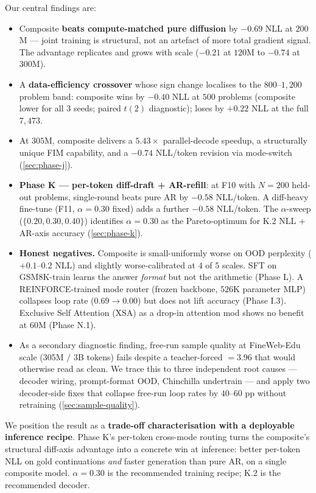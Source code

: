 Our central findings are:

\begin{itemize}
  \item Composite \textbf{beats compute-matched pure diffusion} by
        $-0.69$ NLL at $200$M --- joint training is structural, not
        an artefact of more total gradient signal. The advantage
        replicates and grows with scale ($-0.21$ at $120$M to
        $-0.74$ at $300$M).
  \item A \textbf{data-efficiency crossover} whose sign change
        localises to the $800$--$1{,}200$ problem band: composite wins
        by $-0.40$ NLL at $500$ problems (composite lower for all $3$
        seeds; paired $t(2)$ diagnostic); loses by $+0.22$ NLL at the
        full $7{,}473$.
  \item At $305$M, composite delivers a $\mathbf{5.43\times}$
        parallel-decode speedup, a structurally unique FIM
        capability, and a $-0.74$ NLL/token revision via
        mode-switch (\textsection\ref{sec:phase-j}).
  \item \textbf{Phase K — per-token diff-draft + AR-refill}: at
        F10 with $N=200$ held-out problems, single-round 
        beats pure AR by $\mathbf{-0.58}$ NLL/token. A diff-heavy
        fine-tune (F11, $\alpha\!=\!0.30$ fixed) adds a further
        $\mathbf{-0.58}$ NLL/token. The $\alpha$-sweep
        ($\{0.20, 0.30, 0.40\}$) identifies $\alpha\!=\!0.30$ as
        the Pareto-optimum for K.2 NLL + AR-axis accuracy
        (\textsection\ref{sec:phase-k}).
  \item \textbf{Honest negatives.} Composite is small-uniformly
        worse on OOD perplexity ($+0.1$--$0.2$ NLL) and slightly
        worse-calibrated at $4$ of $5$ scales. SFT on GSM8K-train
        learns the answer \emph{format} but not the arithmetic
        (Phase L). A REINFORCE-trained mode router (frozen backbone,
        $526$K parameter MLP) collapses loop rate ($0.69 \to 0.00$)
        but does not lift accuracy (Phase I.3). Exclusive Self
        Attention (XSA) as a drop-in attention mod shows no
        benefit at $60$M (Phase N.1).
  \item As a secondary diagnostic finding, free-run sample quality
        at FineWeb-Edu scale ($305$M $/$ $3$B tokens) fails despite
        a teacher-forced \arNLL{}$=3.96$ that would otherwise read
        as clean. We trace this to three independent root causes
        --- decoder wiring, prompt-format OOD, Chinchilla undertrain
        --- and apply two decoder-side fixes that collapse free-run
        loop rates by $40$--$60$ pp without retraining
        (\textsection\ref{sec:sample-quality}).
\end{itemize}

We position the result as a \textbf{trade-off characterisation with
a deployable inference recipe}. Phase K's per-token cross-mode
routing turns the composite's structural diff-axis advantage into a
concrete win at inference: better per-token NLL on gold continuations
\emph{and} faster generation than pure AR, on a single composite
model. $\alpha\!=\!0.30$ is the recommended training recipe; K.2
 is the recommended decoder.
